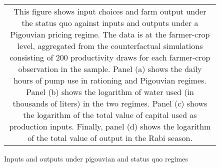 \documentclass{article}
\numberwithin{table}{section}
\begin{document}
\begin{figure}[htbp]
	\centering
	\caption{Inputs and outputs under pigouvian and status quo regimes}
	\subfiguretopcaptrue
	\begin{tabular*}{1.0\textwidth}{c}
		\multicolumn{1}{p{1.0\hsize}}{\footnotesize This figure shows input choices and farm output under the status quo against inputs and outputs under a Pigouvian pricing regime. The data is at the farmer-crop level, aggregated from the counterfactual simulations consisting of 200 productivity draws for each farmer-crop observation in the sample. Panel (a) shows the daily hours of pump use in rationing and Pigouvian regimes. Panel (b) shows the logarithm of water used (in thousands of liters) in the two regimes. Panel (c) shows the logarithm of the total value of capital used as production inputs. Finally, panel (d) shows the logarithm of the total value of output in the Rabi season.} \\
	\end{tabular*}
\end{figure}


\end{document}
